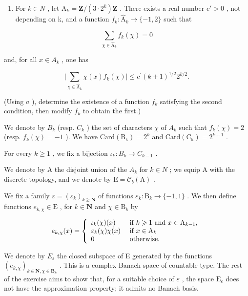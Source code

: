 \begin{enumerate}
\def\labelenumi{\alph{enumi})}
\setcounter{enumi}{1}
\tightlist
\item
  For \(k \in N\) , let \(\mathrm{A}_{k} = \mathbf{Z}/(3 \cdot 2^{k})\mathbf{Z}\) . There exists a real number \(c' > 0\) , not depending on k, and a function \(f_{k} \colon \widehat{\mathrm{A}}_{k} \to \{-1, 2\}\) such that
\end{enumerate}

\[
\sum_ {\chi \in \widehat {\mathrm{A}} _ {k}} f _ {k} (\chi) = 0
\]

and, for all \(x \in A_{k}\) , one has

\[
\Big | \sum_ {\chi \in \widehat {\mathrm{A}} _ {k}} \chi (x) f _ {k} (\chi) \Big | \leqslant c ^ {\prime} (k + 1) ^ {1 / 2} 2 ^ {k / 2}.
\]

(Using \(a\) ), determine the existence of a function \(f_{k}\) satisfying the second condition, then modify \(f_{k}\) to obtain the first.)

We denote by \(B_{k}\) (resp. \(C_{k}\) ) the set of characters \(\chi\) of \(A_{k}\) such that \(f_{k}(\chi)=2\) (resp. \(f_{k}(\chi)=-1\) ). We have \(\mathrm{Card(B_{k})}=2^{k}\) and \(\mathrm{Card(C_{k})}=2^{k+1}\) .

For every \(k \geqslant 1\) , we fix a bijection \(\iota_k \colon B_k \to C_{k-1}\) .

We denote by A the disjoint union of the \(A_{k}\) for \(k \in N\) ; we equip A with the discrete topology, and we denote by \(\mathrm{E} = \mathcal{C}_{b}(\mathrm{A})\) .

We fix a family \(\varepsilon = (\varepsilon_k)_{k\geqslant \mathbf{N}}\) of functions \(\varepsilon_{k}\colon \mathrm{B}_{k}\to \{-1,1\}\) . We then define functions \(e_{k,\chi}\in \mathrm{E}\) , for \(k\in \mathbf{N}\) and \(\chi \in \mathrm{B}_k\) by

\[
e _ {k, \chi} (x) = \left\{ \begin{array}{l l} \iota_ {k} (\chi) (x) & \text { if } k \geqslant 1 \text {   and   } x \in \mathrm{A} _ {k - 1}, \\ \varepsilon_ {k} (\chi) \chi (x) & \text { if } x \in \mathrm{A} _ {k} \\ 0 & \text { otherwise. } \end{array} \right.
\]

We denote by \(E_{\varepsilon}\) the closed subspace of E generated by the functions \((e_{k,\chi})_{k\in\mathbf{N},\chi\in\mathbf{B}_{k}}\) . This is a complex Banach space of countable type. The rest of the exercise aims to show that, for a suitable choice of \(\varepsilon\) , the space \(\mathrm{E}_{\varepsilon}\) does not have the approximation property; it admits no Banach basis.

